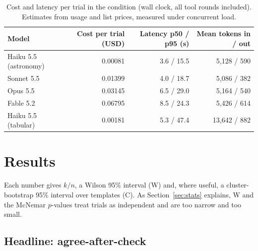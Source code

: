 \documentclass[11pt]{article}
\DeclareRobustCommand{\code}[1]{\texttt{\detokenize{#1}}}
\newcommand{\aac}{agree-after-check}
\begin{document}
\begin{table}[t]
\centering\small
\begin{tabular}{@{}lrrr@{}}
\toprule
Model & Cost per \code{tool} trial (USD) & Latency p50 / p95 (s) & Mean tokens in / out \\
\midrule
Haiku 5.5 (astronomy) & 0.00081 & 3.6 / 15.5 & 5{,}128 / 590 \\
Sonnet 5.5 & 0.01399 & 4.0 / 18.7 & 5{,}086 / 382 \\
Opus 5.5 & 0.03145 & 6.5 / 29.0 & 5{,}164 / 540 \\
Fable 5.2 & 0.06795 & 8.5 / 24.3 & 5{,}426 / 614 \\
Haiku 5.5 (tabular) & 0.00181 & 5.3 / 47.4 & 13{,}642 / 882 \\
\bottomrule
\end{tabular}
\caption{Cost and latency per trial in the \code{tool} condition (wall clock, all tool rounds included). Estimates from usage and list prices, measured under concurrent load.}
\label{tab:cost}
\end{table}

\section{Results}
\label{sec:results}

Each number gives $k/n$, a Wilson 95\% interval (W) and, where useful, a cluster-bootstrap 95\% interval over templates (C).
As Section~\ref{sec:stats} explains, W and the McNemar $p$-values treat trials as independent and are too narrow and too small.

\subsection{Headline: \aac}
\label{sec:res-headline}
\end{document}
